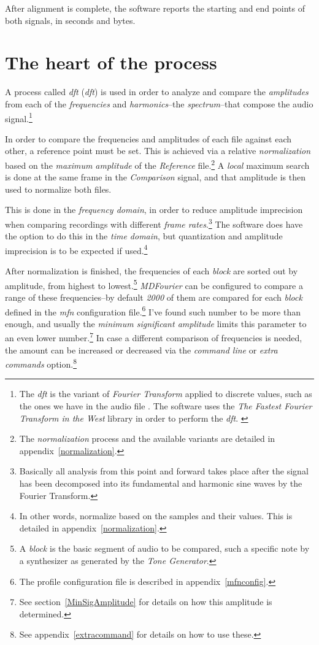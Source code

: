 \documentclass[10pt,a4paper]{report}
\newcommand{\define}[1]{\textit{\acrlong{#1}} (\textit{\acrshort{#1}})}
\newcommand{\ac}[1]{\textit{\mbox{\acrshort{#1}}}}
\begin{document}
After alignment is complete, the software reports the starting and end points of both signals, in seconds and bytes.

\section{The heart of the process}

A process called \define{dft} is used in order to analyze and compare the \textit{amplitudes} from each of the \textit{frequencies} and \textit{harmonics}--the \textit{spectrum}--that compose the audio signal.\footnote{The \ac{dft} is the variant of \textit{Fourier Transform} applied to discrete values, such as the ones we have in the audio file \cite{FourierTransformApps}. The software uses the \textit{The Fastest Fourier Transform in the West} library in order to perform the \ac{dft}. \cite{fftw}}

In order to compare the frequencies and amplitudes of each file against each other, a reference point must be set. This is achieved via a relative \textit{normalization} based on the \textit{maximum amplitude} of the \textit{Reference} file.\footnote{The \textit{normalization} process and the available variants are detailed in appendix~\ref{normalization}.} A \textit{local} maximum search is done at the same frame in the \textit{Comparison} signal, and that amplitude is then used to normalize both files. 

This is done in the \textit{frequency domain}, in order to reduce amplitude imprecision when comparing recordings with different \textit{frame rates}.\footnote{Basically all analysis from this point and forward takes place after the signal has been decomposed into its fundamental and harmonic sine waves by the Fourier Transform.} The software does have the option to do this in the \textit{time domain}, but quantization and amplitude imprecision is to be expected if used.\footnote{In other words, normalize based on the samples and their values. This is detailed in appendix~\ref{normalization}.}

After normalization is finished, the frequencies of each \textit{block} are sorted out by amplitude, from highest to lowest.\footnote{A \textit{block} is the basic segment of audio to be compared, such a specific note by a synthesizer as generated by the \textit{Tone Generator}.} \textit{MDFourier} can be configured to compare a range of these frequencies--by default \textit{2000} of them are compared for each \textit{block} defined in the \textit{mfn} configuration file.\footnote{The profile configuration file is described in appendix~\ref{mfnconfig}.} I've found such number to be more than enough, and usually the \textit{minimum significant amplitude} limits this parameter to an even lower number.\footnote{See section~\ref{MinSigAmplitude} for details on how this amplitude is determined.} In case a different comparison of frequencies is needed, the amount can be increased or decreased via the \textit{command line} or \textit{extra commands} option.\footnote{See appendix~\ref{extracommand} for details on how to use these.}
\end{document}
